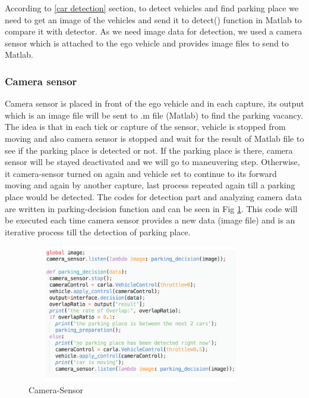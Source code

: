 According to \ref{car detection} section, to detect vehicles and find parking place we need to get an image of the vehicles and send it to detect() function in Matlab to compare it with detector. As we need image data for detection, we used a camera sensor which is attached to the ego vehicle and provides image files to send to Matlab.

\subsubsection{Camera sensor}
Camera sensor is placed in front of the ego vehicle and in each capture, its output which is an image file will be sent to .m file (Matlab) to find the parking vacancy. The idea is that in each tick or capture of the sensor, vehicle is stopped from moving and also camera sensor is stopped and wait for the result of Matlab file to see if the parking place is detected or not. If the parking place is there, camera sensor will be stayed deactivated and we will go to maneuvering step. Otherwise, it camera-sensor turned on again and vehicle set to continue to its forward moving and again by another capture, last process repeated again till a parking place would be detected. The codes for detection part and analyzing camera data are written in parking-decision function and can be seen in Fig \ref{fig:camera}. This code will be executed each time camera sensor provides a new data (image file) and is an iterative process till the detection of parking place.
\begin{figure}
\centering
    \includegraphics[width=10cm, height=6cm]{images/cameraSensor.pdf} 
    \caption{Camera-Sensor}
    \label{fig:camera}
\end{figure}

